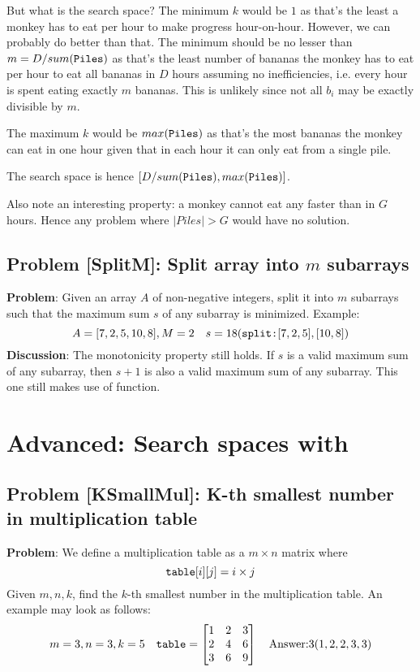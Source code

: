 But what is the search space? The minimum $k$ would be $1$ as that's the least a monkey has to eat per hour to make progress hour-on-hour. However, we can probably do better than that. The minimum should be no lesser than $m = D/sum(\verb|Piles|)$ as that's the least number of bananas the monkey has to eat per hour to eat all bananas in $D$ hours assuming no inefficiencies, i.e. every hour is spent eating exactly $m$ bananas. This is unlikely since not all $b_i$ may be exactly divisible by $m$.

The maximum $k$ would be $max(\verb|Piles|)$ as that's the most bananas the monkey can eat in one hour given that in each hour it can only eat from a single pile. 

The search space is hence $[D/sum(\verb|Piles|), max(\verb|Piles|)]$.

Also note an interesting property: a monkey cannot eat any faster than in $G$ hours. Hence any problem where $|Piles| > G$ would have no solution.

\subsection{Problem [SplitM]: Split array into $m$ subarrays}
\textbf{Problem}: Given an array $A$ of non-negative integers, split it into $m$ subarrays such that the maximum sum $s$ of any subarray is minimized. Example:
$$
A = [7, 2, 5, 10, 8], M = 2 \quad s = 18(\verb|split:| [7, 2, 5], [10, 8])
$$
\textbf{Discussion}: The monotonicity property still holds. If $s$ is a valid maximum sum of any subarray, then $s+1$ is also a valid maximum sum of any subarray. This one still makes use of  function.

\section{Advanced: Search spaces with }
\subsection{Problem [KSmallMul]: K-th smallest number in multiplication table}
\textbf{Problem}: We define a multiplication table as a $m \times n$ matrix where $$\verb|table|[i][j] = i \times j$$Given $m, n, k$, find the $k$-th smallest number in the multiplication table. An example may look as follows:
$$
m = 3, n = 3, k = 5 \quad \verb|table| = \begin{bmatrix}
1 & 2 & 3 \\
2 & 4 & 6 \\
3 & 6 & 9 
\end{bmatrix}
\quad \text{Answer:} 3(1, 2, 2, 3, 3)
$$

